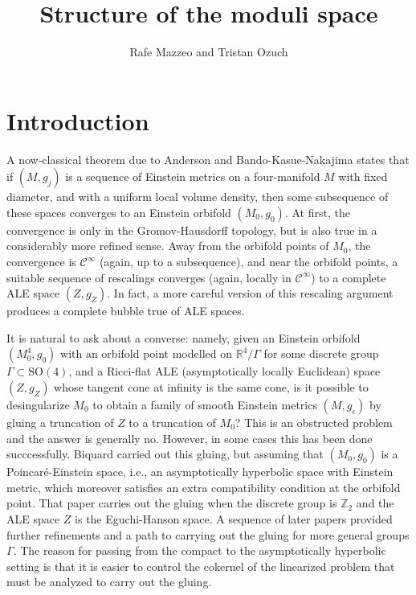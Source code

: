 \documentclass[12pt]{article}
\title{Structure of the moduli space}
\author{Rafe Mazzeo and Tristan Ozuch}
\date{ }
\newcommand{\RR}{\mathbb R}
\newcommand{\ZZ}{\mathbb Z}
\newcommand{\calC}{{\mathcal C}}
\begin{document}
\maketitle

\tableofcontents

\section{Introduction}
A now-classical theorem due to Anderson \cite{And} and Bando-Kasue-Nakajima \cite{BKN} states that if $(M, g_j)$ is a sequence of
Einstein metrics on a four-manifold $M$ with fixed diameter, and with a uniform local volume density, then 
some subsequence of these spaces converges to an Einstein orbifold $(M_0, g_0)$.  At first, the convergence is
only in the Gromov-Hausdorff topology, but is also true in a considerably more refined sense. Away from the
orbifold points of $M_0$, the convergence is $\calC^\infty$ (again, up to a subsequence), and near the orbifold
points, a suitable sequence of rescalings converges (again, locally in $\calC^\infty$) to a complete ALE space
$(Z, g_Z)$.  In fact, a more careful version of this rescaling argument produces a complete bubble true of ALE spaces.

It is natural to ask about a converse: namely, given an Einstein orbifold $(M^4_0, g_0)$ with an orbifold
point modelled on $\RR^4/\Gamma$ for some discrete group $\Gamma \subset \mathrm{SO}(4)$, and a
Ricci-flat ALE (asymptotically locally Euclidean) space $(Z, g_Z)$ whose tangent cone at infinity is the same cone, is it possible to desingularize
$M_0$ to obtain a family of smooth Einstein metrics $(M, g_\epsilon)$ by gluing a truncation of $Z$ to a 
truncation of $M_0$?   This is an obstructed problem and the answer is generally no.  However, in some cases
this has been done succcessfully.  Biquard \cite{Biq1} carried out this gluing, but assuming that $(M_0, g_0)$
is a Poincar\'e-Einstein space, i.e., an asymptotically hyperbolic space with Einstein metric, which moreover
satisfies an extra compatibility condition at the orbifold point. That paper carries out the gluing when the discrete 
group is $\ZZ_2$ and the ALE space $Z$ is the Eguchi-Hanson space. A sequence of later papers provided
further refinements and a path to carrying out the gluing for more general groups $\Gamma$. The reason for passing 
from the compact to the asymptotically hyperbolic setting is that it is easier to control the cokernel of the
linearized problem that must be analyzed to carry out the gluing.
\end{document}
